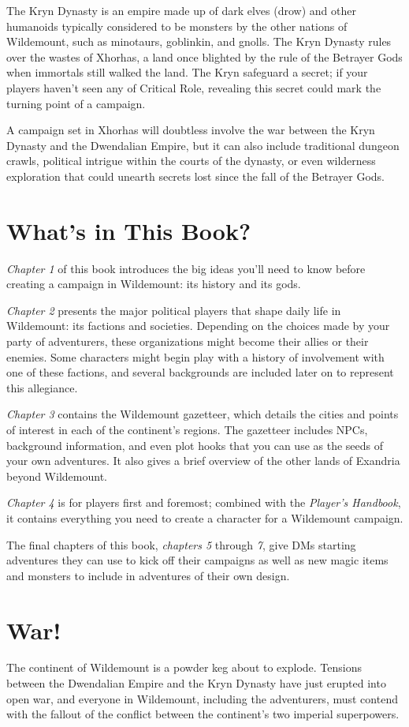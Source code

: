 \documentclass[10pt,a4paper,twoside,bg=print,twocolumn,openany,nodeprecatedcode]{dndbook}
\begin{document}
The Kryn Dynasty is an empire made up of dark elves (drow) and other humanoids typically considered to be monsters by the other nations of Wildemount, such as minotaurs, goblinkin, and gnolls. The Kryn Dynasty rules over the wastes of Xhorhas, a land once blighted by the rule of the Betrayer Gods when immortals still walked the land. The Kryn safeguard a secret; if your players haven't seen any of Critical Role, revealing this secret could mark the turning point of a campaign.

A campaign set in Xhorhas will doubtless involve the war between the Kryn Dynasty and the Dwendalian Empire, but it can also include traditional dungeon crawls, political intrigue within the courts of the dynasty, or even wilderness exploration that could unearth secrets lost since the fall of the Betrayer Gods.

\section{What's in This Book?}
\textit{Chapter 1} of this book introduces the big ideas you'll need to know before creating a campaign in Wildemount: its history and its gods.

\textit{Chapter 2} presents the major political players that shape daily life in Wildemount: its factions and societies. Depending on the choices made by your party of adventurers, these organizations might become their allies or their enemies. Some characters might begin play with a history of involvement with one of these factions, and several backgrounds are included later on to represent this allegiance.

\textit{Chapter 3} contains the Wildemount gazetteer, which details the cities and points of interest in each of the continent's regions. The gazetteer includes NPCs, background information, and even plot hooks that you can use as the seeds of your own adventures. It also gives a brief overview of the other lands of Exandria beyond Wildemount.

\textit{Chapter 4} is for players first and foremost; combined with the \textit{Player's Handbook}, it contains everything you need to create a character for a Wildemount campaign.

The final chapters of this book, \textit{chapters 5} through \textit{7}, give DMs starting adventures they can use to kick off their campaigns as well as new magic items and monsters to include in adventures of their own design.

\section{War!}
The continent of Wildemount is a powder keg about to explode. Tensions between the Dwendalian Empire and the Kryn Dynasty have just erupted into open war, and everyone in Wildemount, including the adventurers, must contend with the fallout of the conflict between the continent's two imperial superpowers.
\end{document}
